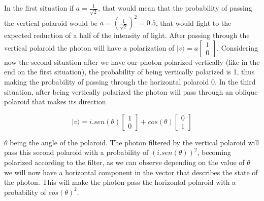 In the first situation if $a = \frac{1}{\sqrt{2}}$, that would mean that the probability of passing the vertical polaroid would be $a = (\frac{1}{\sqrt{2}})^{2} = 0.5$, that would light to the expected reduction of a half of the intensity of light. After passing through the vertical polaroid the photon will have a polarization of $\vert v \rangle = a\left[\begin{array}{c}
1\\
0
\end{array}\right]$. Considering now the second situation after we have our photon polarized vertically (like in the end on the first situation), the probability of being vertically polarized is 1, thus making the probability of passing through the horizontal polaroid 0.
In the third situation, after being vertically polarized the photon will pass through an oblique polaroid that makes its direction

\begin{equation}
\vert v \rangle = i.sen(\theta) \left[\begin{array}{c}
1\\
0
\end{array}\right]+ cos(\theta)\left[\begin{array}{c}
0\\
1
\end{array}\right]
\end{equation}



$\theta$ being the angle of the polaroid. The photon filtered by the vertical polaroid will pass this second polaroid with a probability of $(i.sen(\theta))^{2}$, becoming polarized according to the filter, as we can observe depending on the value of $\theta$ we will now have a horizontal component in the vector that describes the state of the photon. This will make the photon pass the horizontal polaroid  with a probability of $cos(\theta)^{2}$. 



















